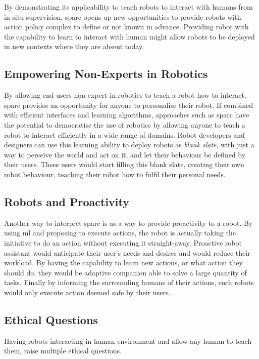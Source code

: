 By demonstrating its applicability to teach robots to interact with humans from in-situ supervision, \gls{sparc} opens up new opportunities to provide robots with action policy complex to define or not known in advance. Providing robot with the capability to learn to interact with human might allow robots to be deployed in new contexts where they are absent today.

\subsection{Empowering Non-Experts in Robotics}

By allowing end-users non-expert in robotics to teach a robot how to interact, \gls{sparc} provides an opportunity for anyone to personalise their robot. If combined with efficient interfaces and learning algorithms, approaches such as \gls{sparc} have the potential to democratise the use of robotics by allowing anyone to teach a robot to interact efficiently in a wide range of domains. Robot developers and designers can use this learning ability to deploy robots as \emph{blank slate}, with just a way to perceive the world and act on it, and let their behaviour be defined by their users. These users would start filling this blank slate, creating their own robot behaviour, teaching their robot how to fulfil their personal needs.

\subsection{Robots and Proactivity}

Another way to interpret \gls{sparc} is as a way to provide proactivity to a robot. By using \gls{ml} and proposing to execute actions, the robot is actually taking the initiative to do an action without executing it straight-away. Proactive robot assistant would anticipate their user's needs and desires and would reduce their workload. By having the capability to learn new actions, or what action they should do, they would be adaptive companion able to solve a large quantity of tasks. Finally by informing the surrounding humans of their actions, such robots would only execute action deemed safe by their users.

\subsection{Ethical Questions} \label{sec:disc_ethics}

Having robots interacting in human environment and allow any human to teach them, raise multiple ethical questions.

